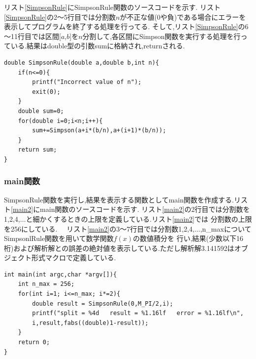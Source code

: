 \documentclass[dvipdfmx]{jarticle}
\begin{document}
      リスト\ref{SimpsonRule}にSimpsonRule関数のソースコードを示す.
      リスト\ref{SimpsonRule}の2～5行目では分割数$n$が不正な値(0や負)である場合にエラーを表示してプログラムを終了する処理を行ってる.
      そして,リスト\ref{SimpsonRule}の6～11行目では区間[$a$,$b$]を$n$分割して,各区間にSimpson関数を実行する処理を行っている.結果はdouble型の引数sumに格納され,returnされる.
      \begin{lstlisting}[basicstyle=\ttfamily\footnotesize, frame=single,label=SimpsonRule,caption=SimpsonRule関数]
double SimpsonRule(double a,double b,int n){
    if(n<=0){
        printf("Incorrect value of n");
        exit(0);
    }
    double sum=0;
    for(double i=0;i<n;i++){
        sum+=Simpson(a+i*(b/n),a+(i+1)*(b/n));
    }
    return sum;
}
            \end{lstlisting}

    \subsubsection{main関数}
    SimpsonRule関数を実行し,結果を表示する関数としてmain関数を作成する.リスト\ref{main2}にmain関数のソースコードを示す.
    リスト\ref{main2}の2行目では分割数を1,2,4,$\dots$と細かくするときの上限を定義している.リスト\ref{main2}では
    分割数の上限を256にしている.
    　リスト\ref{main2}の3～7行目では分割数1,2,4,$\dots$,n\_maxについてSimpsonlRule関数を用いて数学関数$f(x)$の数値積分を
    行い,結果(少数以下16桁)および解析解との誤差の絶対値を表示している.ただし解析解3.141592はオブジェクト形式マクロで定義している.
      \begin{lstlisting}[basicstyle=\ttfamily\footnotesize, frame=single,label=main2,caption=main2関数]
int main(int argc,char *argv[]){
    int n_max = 256;
    for(int i=1; i<=n_max; i*=2){
        double result = SimpsonRule(0,M_PI/2,i);
        printf("split = %4d   result = %1.16lf   error = %1.16lf\n",
        i,result,fabs((double)1-result));
    }
    return 0;
}
    \end{lstlisting}
\end{document}
